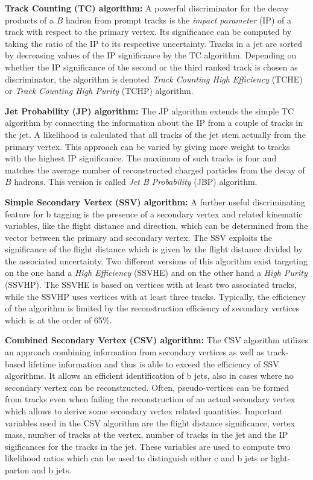 \begin{description}
 \item \textbf{Track Counting (TC) algorithm:} A powerful discriminator for the decay products of a $B$ hadron from prompt tracks is the \textit{impact parameter} (IP) of a track with respect to the primary vertex. Its significance can be computed by taking the ratio of the IP to its respective uncertainty. Tracks in a jet are sorted by decreasing values of the IP significance by the TC algorithm. Depending on whether the IP significance of the second or the third ranked track is chosen as discriminator, the algorithm is denoted \textit{Track Counting High Efficiency} (TCHE) or \textit{Track Counting High Purity} (TCHP) algorithm. 
 \item \textbf{Jet Probability (JP) algorithm:} The JP algorithm extends the simple TC algorithm by connecting the information about the IP from a couple of tracks in the jet. A likelihood is calculated that all tracks of the jet stem actually from the primary vertex. This approach can be varied by giving more weight to tracks with the highest IP significance. The maximum of such tracks is four and matches the average number of reconstructed charged particles from the decay of $B$ hadrons. This version is called \textit{Jet B Probability} (JBP) algorithm.
 \item \textbf{Simple Secondary Vertex (SSV) algorithm:} A further useful discriminating feature for b tagging is the presence of a secondary vertex and related kinematic variables, like the flight distance and direction, which can be determined from the vector between the primary and secondary vertex. The SSV exploits the significance of the flight distance which is given by the flight distance divided by the associated uncertainty. Two different versions of this algorithm exist targeting on the one hand a \textit{High Efficiency} (SSVHE) and on the other hand a \textit{High Purity} (SSVHP). The SSVHE is based on vertices with at least two associated tracks, while the SSVHP uses vertices with at least three tracks. Typically, the efficiency of the algorithm is limited by the reconstruction efficiency of secondary vertices which is at the order of 65\%.   
 \item \textbf{Combined Secondary Vertex (CSV) algorithm:} The CSV algorithm utilizes an approach combining information from secondary vertices as well as track-based lifetime information and thus is able to exceed the efficiency of SSV algorithms. It allows an efficient identification of b jets, also in cases where no secondary vertex can be reconstructed. Often, pseudo-vertices can be formed from tracks even when failing the reconstruction of an actual secondary vertex which allows to derive some secondary vertex related quantities. Important variables used in the CSV algorithm are the flight distance significance, vertex mass, number of tracks at the vertex, number of tracks in the jet and the IP sigificances for the tracks in the jet. These variables are used to compute two likelihood ratios which can be used to distinguish either c and b jets or light-parton and b jets. 
\end{description}  
